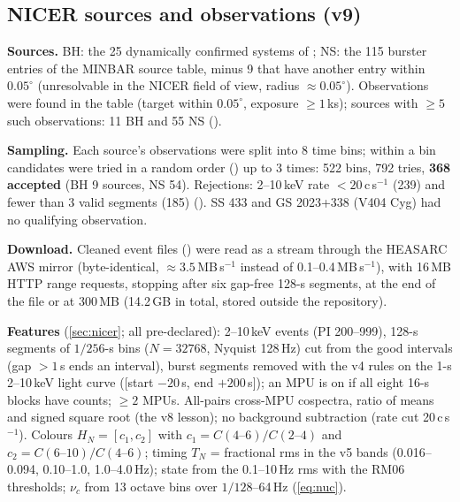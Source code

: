 \subsection{NICER sources and observations (v9)}
\textbf{Sources.} BH: the 25 dynamically confirmed systems of \citet[Table 1]{Marcel2026}; NS: the 115 burster entries of the
MINBAR source table, minus 9 that have another entry within $0.05^\circ$ (unresolvable in the NICER field of view, radius
$\approx0.05^\circ$). Observations were found in the  table (target within $0.05^\circ$, exposure $\ge1$\,ks);
sources with $\ge5$ such observations: 11 BH and 55 NS ().

\textbf{Sampling.} Each source's observations were split into 8 time bins; within a bin candidates were tried in a random order
() up to 3 times: 522 bins, 792 tries, \textbf{368 accepted} (BH 9 sources, NS 54). Rejections:
2--10\,keV rate $<20$\,c\,s$^{-1}$ (239) and fewer than 3 valid segments (185) (). SS 433 and
GS 2023+338 (V404 Cyg) had no qualifying observation.

\textbf{Download.} Cleaned event files () were read as a stream through the HEASARC AWS mirror
(byte-identical, $\approx3.5$\,MB\,s$^{-1}$ instead of 0.1--0.4\,MB\,s$^{-1}$), with 16\,MB HTTP range requests, stopping after six
gap-free 128-s segments, at the end of the file or at 300\,MB (14.2\,GB in total, stored outside the repository).

\textbf{Features} (\cref{sec:nicer}; all pre-declared): 2--10\,keV events (PI 200--999), 128-s segments of $1/256$-s bins
($N=32768$, Nyquist 128\,Hz) cut from the good intervals (gap $>1$\,s ends an interval), burst segments removed with the v4 rules
on the 1-s 2--10\,keV light curve ([start $-20$\,s, end $+200$\,s]); an MPU is on if all eight 16-s blocks have counts; $\ge2$ MPUs.
All-pairs cross-MPU cospectra, ratio of means and signed square root (the v8 lesson); no background subtraction (rate cut
20\,c\,s$^{-1}$). Colours $H_N=[c_1,c_2]$ with $c_1=C(4\text{--}6)/C(2\text{--}4)$ and $c_2=C(6\text{--}10)/C(4\text{--}6)$; timing
$T_N$ = fractional rms in the v5 bands (0.016--0.094, 0.10--1.0, 1.0--4.0\,Hz); state from the 0.1--10\,Hz rms with the RM06
thresholds; $\nu_c$ from 13 octave bins over $1/128$--64\,Hz (\cref{eq:nuc}).

